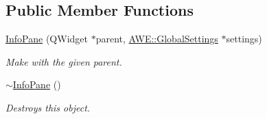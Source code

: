 \subsection*{Public Member Functions}
\begin{DoxyCompactItemize}
\item 
\hyperlink{class_u_i_1_1_info_pane_a02f3fc3d52c48dcf83b09f58cea7e87f}{Info\-Pane} (Q\-Widget $\ast$parent, \hyperlink{class_a_w_e_1_1_global_settings}{A\-W\-E\-::\-Global\-Settings} $\ast$settings)
\begin{DoxyCompactList}\small\item\em Make with the given parent. \end{DoxyCompactList}\item 
\hypertarget{class_u_i_1_1_info_pane_a9983b6b184dcd9583184c388ad66def7}{\hyperlink{class_u_i_1_1_info_pane_a9983b6b184dcd9583184c388ad66def7}{$\sim$\-Info\-Pane} ()}\label{class_u_i_1_1_info_pane_a9983b6b184dcd9583184c388ad66def7}

\begin{DoxyCompactList}\small\item\em Destroys this object. \end{DoxyCompactList}\end{DoxyCompactItemize}

